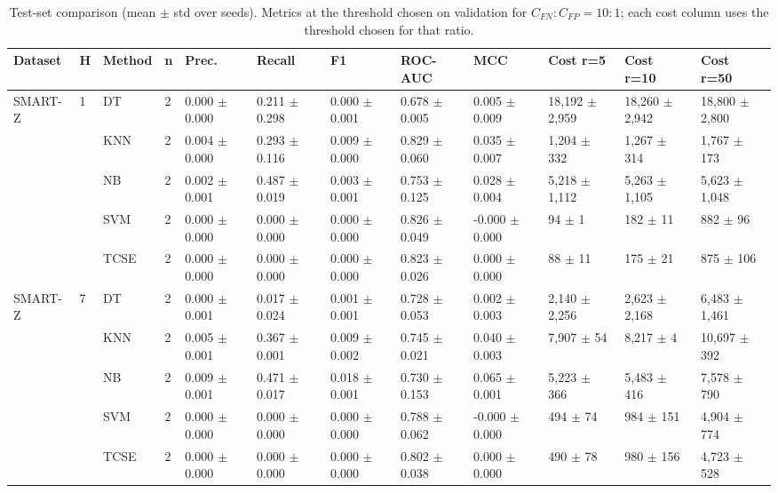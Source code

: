 \begin{table}[t]
\centering
\caption{Test-set comparison (mean $\pm$ std over seeds). Metrics at the threshold chosen on validation for $C_{FN}{:}C_{FP}=10{:}1$; each cost column uses the threshold chosen for that ratio.}
\label{tab:table1_main_comparison}
\footnotesize
\begin{tabular}{llllllllllll}
\toprule
Dataset & H & Method & n & Prec. & Recall & F1 & ROC-AUC & MCC & Cost r=5 & Cost r=10 & Cost r=50 \\
\midrule
SMART-Z & 1 & DT & 2 & 0.000 $\pm$ 0.000 & 0.211 $\pm$ 0.298 & 0.000 $\pm$ 0.001 & 0.678 $\pm$ 0.005 & 0.005 $\pm$ 0.009 & 18,192 $\pm$ 2,959 & 18,260 $\pm$ 2,942 & 18,800 $\pm$ 2,800 \\
 &  & KNN & 2 & 0.004 $\pm$ 0.000 & 0.293 $\pm$ 0.116 & 0.009 $\pm$ 0.000 & 0.829 $\pm$ 0.060 & 0.035 $\pm$ 0.007 & 1,204 $\pm$ 332 & 1,267 $\pm$ 314 & 1,767 $\pm$ 173 \\
 &  & NB & 2 & 0.002 $\pm$ 0.001 & 0.487 $\pm$ 0.019 & 0.003 $\pm$ 0.001 & 0.753 $\pm$ 0.125 & 0.028 $\pm$ 0.004 & 5,218 $\pm$ 1,112 & 5,263 $\pm$ 1,105 & 5,623 $\pm$ 1,048 \\
 &  & SVM & 2 & 0.000 $\pm$ 0.000 & 0.000 $\pm$ 0.000 & 0.000 $\pm$ 0.000 & 0.826 $\pm$ 0.049 & -0.000 $\pm$ 0.000 & 94 $\pm$ 1 & 182 $\pm$ 11 & 882 $\pm$ 96 \\
 &  & TCSE & 2 & 0.000 $\pm$ 0.000 & 0.000 $\pm$ 0.000 & 0.000 $\pm$ 0.000 & 0.823 $\pm$ 0.026 & 0.000 $\pm$ 0.000 & 88 $\pm$ 11 & 175 $\pm$ 21 & 875 $\pm$ 106 \\
SMART-Z & 7 & DT & 2 & 0.000 $\pm$ 0.001 & 0.017 $\pm$ 0.024 & 0.001 $\pm$ 0.001 & 0.728 $\pm$ 0.053 & 0.002 $\pm$ 0.003 & 2,140 $\pm$ 2,256 & 2,623 $\pm$ 2,168 & 6,483 $\pm$ 1,461 \\
 &  & KNN & 2 & 0.005 $\pm$ 0.001 & 0.367 $\pm$ 0.001 & 0.009 $\pm$ 0.002 & 0.745 $\pm$ 0.021 & 0.040 $\pm$ 0.003 & 7,907 $\pm$ 54 & 8,217 $\pm$ 4 & 10,697 $\pm$ 392 \\
 &  & NB & 2 & 0.009 $\pm$ 0.001 & 0.471 $\pm$ 0.017 & 0.018 $\pm$ 0.001 & 0.730 $\pm$ 0.153 & 0.065 $\pm$ 0.001 & 5,223 $\pm$ 366 & 5,483 $\pm$ 416 & 7,578 $\pm$ 790 \\
 &  & SVM & 2 & 0.000 $\pm$ 0.000 & 0.000 $\pm$ 0.000 & 0.000 $\pm$ 0.000 & 0.788 $\pm$ 0.062 & -0.000 $\pm$ 0.000 & 494 $\pm$ 74 & 984 $\pm$ 151 & 4,904 $\pm$ 774 \\
 &  & TCSE & 2 & 0.000 $\pm$ 0.000 & 0.000 $\pm$ 0.000 & 0.000 $\pm$ 0.000 & 0.802 $\pm$ 0.038 & 0.000 $\pm$ 0.000 & 490 $\pm$ 78 & 980 $\pm$ 156 & 4,723 $\pm$ 528 \\

\end{tabular}
\end{table}
